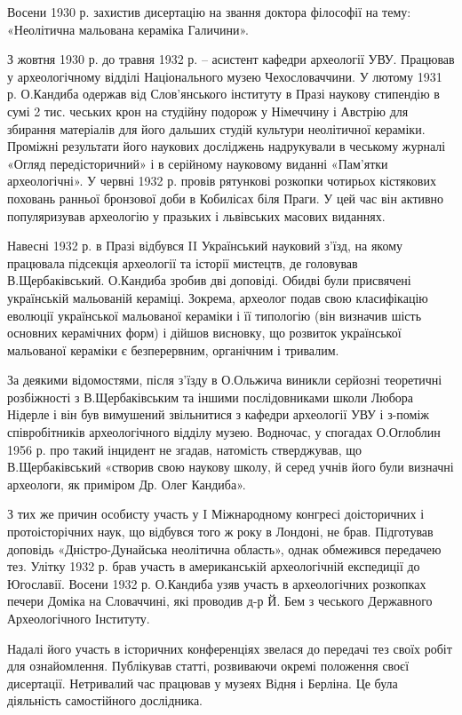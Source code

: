 Восени 1930 р. захистив дисертацію на звання доктора філософії на тему: «Неолітична мальована кераміка Галичини».

З жовтня 1930 р. до травня 1932 р. – асистент кафедри археології УВУ. Працював
у археологічному відділі Національного музею Чехословаччини. У лютому 1931 р.
О.Кандиба одержав від Слов'янського інституту в Празі наукову стипендію в сумі
2 тис. чеських крон на студійну подорож у Німеччину і Австрію для збирання
матеріалів для його дальших студій культури неолітичної кераміки. Проміжні
результати його наукових досліджень надрукували в чеському журналі «Огляд
передісторичний» і в серійному науковому виданні «Пам'ятки археологічні». У
червні 1932 р. провів рятункові розкопки чотирьох кістякових поховань ранньої
бронзової доби в Кобилісах біля Праги. У цей час він активно популяризував
археологію у празьких і львівських масових виданнях.

Навесні 1932 р. в Празі відбувся II Український науковий з'їзд, на якому
працювала підсекція археології та історії мистецтв, де головував
В.Щербаківський. О.Кандиба зробив дві доповіді. Обидві були присвячені
українській мальованій кераміці. Зокрема, археолог подав свою класифікацію
еволюції української мальованої кераміки і її типологію (він визначив шість
основних керамічних форм) і дійшов висновку, що розвиток української мальованої
кераміки є безперервним, органічним і тривалим.

За деякими відомостями, після з'їзду в О.Ольжича виникли серйозні теоретичні
розбіжності з В.Щербаківським та іншими послідовниками школи Любора Нідерле і
він був вимушений звільнитися з кафедри археології УВУ і з-поміж співробітників
археологічного відділу музею. Водночас, у спогадах О.Оглоблин 1956 р. про такий
інцидент не згадав, натомість стверджував, що В.Щербаківський «створив свою
наукову школу, й серед учнів його були визначні археологи, як приміром Др. Олег
Кандиба».

З тих же причин особисту участь у I Міжнародному конгресі доісторичних і
протоісторічних наук, що відбувся того ж року в Лондоні, не брав. Підготував
доповідь «Дністро-Дунайська неолітична область», однак обмежився передачею тез.
Улітку 1932 р. брав участь в американській археологічній експедиції до
Югославії. Восени 1932 р. О.Кандиба узяв участь в археологічних розкопках
печери Доміка на Словаччині, які проводив д-р Й. Бем з чеського Державного
Археологічного Інституту.

Надалі його участь в історичних конференціях звелася до передачі тез своїх
робіт для ознайомлення. Публікував статті, розвиваючи окремі положення своєї
дисертації. Нетривалий час працював у музеях Відня і Берліна. Це була
діяльність самостійного дослідника.

